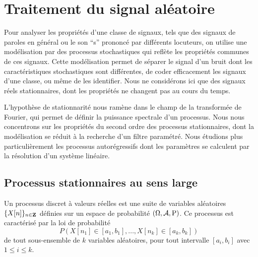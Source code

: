 \chapter{Traitement du signal al\'eatoire}
\label{aleatoire-chap}

Pour analyser les propri\'et\'es d'une 
classe de signaux, tels que des signaux de paroles en g\'en\'eral
ou le son ``s'' prononc\'e par diff\'erents locuteurs,
on utilise une mod\'elisation par des processus stochastiques qui
refl\`ete les propri\'et\'es communes de ces signaux.
Cette mod\'elisation permet de s\'eparer le
signal d'un bruit dont les caract\'eristiques stochastiques
sont diff\'erentes, de coder efficacement les signaux d'une 
classe, ou m\^eme de les identifier.
Nous ne consid\'erons ici que des signaux 
r\'eels stationnaires, dont 
les propri\'et\'es ne changent
pas au cours du temps.

L'hypoth\`ese de stationnarit\'e nous ram\`ene dans le champ de la
transform\'ee de Fourier, qui permet de d\'efinir la
puissance spectrale d'un processus. Nous nous
concentrons sur les propri\'et\'es du second ordre des
processus stationnaires, dont la
mod\'elisation se r\'eduit \`a la recherche
d'un filtre param\'etr\'e. Nous \'etudions plus 
particuli\`erement les processus autor\'egressifs dont les
param\`etres se calculent par la r\'esolution d'un syst\`eme
lin\'eaire.

\section{Processus stationnaires au sens large}

Un processus discret \`a valeurs r\'eelles est une suite 
de variables al\'eatoires $\{X[n]\}_{ n \in {{\bf{Z}}}}$ 
d\'efinies sur un espace de probabilit\'e
$(\Omega , {\cal A} , {\rm P})$.
Ce processus est caract\'eris\'e par la loi de probabilit\'e
\[
P(X[{n_1}] \in [a_1,b_1] , ... , X[{n_k}] \in [a_k,b_k] )
\]
de tout sous-ensemble de $k$ variables al\'eatoires, pour tout
intervalle $[a_i,b_i]$ avec $1 \leq i \leq k$.

